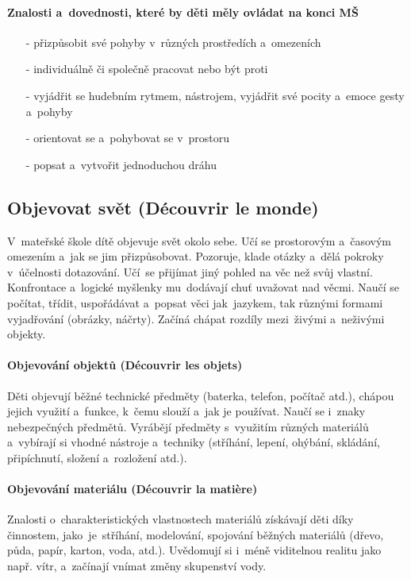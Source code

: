 				\paragraph{Znalosti a~dovednosti, které by děti měly ovládat na konci MŠ}

				\begin{itemize}
					\setlength\itemsep{-2mm}
					\item[-] přizpůsobit své pohyby v různých prostředích a~omezeních
					\item[-] individuálně či společně pracovat nebo být proti
					\item[-] vyjádřit se hudebním rytmem, nástrojem, vyjádřit své pocity a~emoce gesty a~pohyby
					\item[-] orientovat se a~pohybovat se v prostoru
					\item[-] popsat a~vytvořit jednoduchou dráhu
				\end{itemize}

		\subsection{Objevovat svět (Découvrir le monde)}
			V mateřské škole dítě objevuje svět okolo sebe. Učí se prostorovým a~časovým omezením a jak se jim přizpůsobovat. Pozoruje, klade otázky a~dělá pokroky v účelnosti dotazování. Učí se přijímat jiný pohled na věc než svůj vlastní.  Konfrontace a~logické myšlenky mu dodávají chuť uvažovat nad věcmi. Naučí se počítat, třídit, uspořádávat a~popsat věci jak jazykem, tak různými formami vyjadřování (obrázky, náčrty). Začíná chápat rozdíly mezi živými a~neživými objekty.

			\paragraph{Objevování objektů (Découvrir les objets)}
				Děti objevují běžné technické předměty (baterka, telefon, počítač atd.), chápou jejich využití a~funkce, k čemu slouží a~jak je používat. Naučí se i~znaky nebezpečných předmětů.
				Vyrábějí předměty s~využitím různých materiálů a~vybírají si vhodné nástroje a~techniky (stříhání, lepení, ohýbání, skládání, připíchnutí, složení a~rozložení atd.).
			\paragraph{Objevování materiálu (Découvrir la matière)}
				Znalosti o~charakteristických vlastnostech materiálů získávají děti díky činnostem, jako je stříhání, modelování, spojování běžných materiálů (dřevo, půda, papír, karton, voda, atd.).
				Uvědomují si i~méně viditelnou realitu jako např. vítr, a~začínají vnímat změny skupenství vody. 
